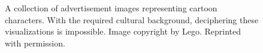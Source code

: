 \begin{figure}
  \centering
  \caption{A collection of advertisement images representing cartoon characters. With the required cultural background, deciphering these visualizations is impossible. Image copyright by Lego. Reprinted with permission.}
  \label{fig:intro:vis:lego}
\end{figure}

